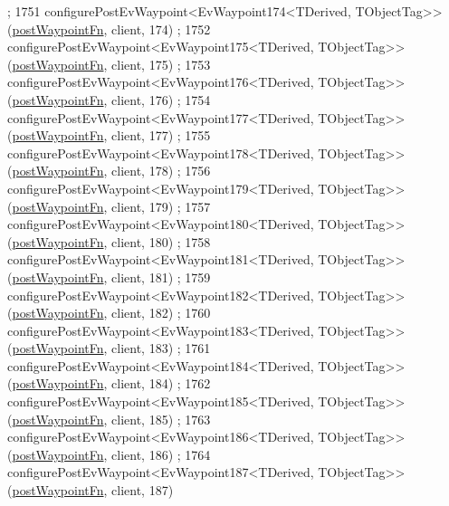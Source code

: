 \begin{DoxyCode}
      ;
1751     configurePostEvWaypoint<EvWaypoint174<TDerived, TObjectTag>>(\hyperlink{classsmacc_1_1WaypointEventDispatcher_a6bccf6a93a827634b7b5e67ac0e4ec57}{postWaypointFn}, client, 174)
      ;
1752     configurePostEvWaypoint<EvWaypoint175<TDerived, TObjectTag>>(\hyperlink{classsmacc_1_1WaypointEventDispatcher_a6bccf6a93a827634b7b5e67ac0e4ec57}{postWaypointFn}, client, 175)
      ;
1753     configurePostEvWaypoint<EvWaypoint176<TDerived, TObjectTag>>(\hyperlink{classsmacc_1_1WaypointEventDispatcher_a6bccf6a93a827634b7b5e67ac0e4ec57}{postWaypointFn}, client, 176)
      ;
1754     configurePostEvWaypoint<EvWaypoint177<TDerived, TObjectTag>>(\hyperlink{classsmacc_1_1WaypointEventDispatcher_a6bccf6a93a827634b7b5e67ac0e4ec57}{postWaypointFn}, client, 177)
      ;
1755     configurePostEvWaypoint<EvWaypoint178<TDerived, TObjectTag>>(\hyperlink{classsmacc_1_1WaypointEventDispatcher_a6bccf6a93a827634b7b5e67ac0e4ec57}{postWaypointFn}, client, 178)
      ;
1756     configurePostEvWaypoint<EvWaypoint179<TDerived, TObjectTag>>(\hyperlink{classsmacc_1_1WaypointEventDispatcher_a6bccf6a93a827634b7b5e67ac0e4ec57}{postWaypointFn}, client, 179)
      ;
1757     configurePostEvWaypoint<EvWaypoint180<TDerived, TObjectTag>>(\hyperlink{classsmacc_1_1WaypointEventDispatcher_a6bccf6a93a827634b7b5e67ac0e4ec57}{postWaypointFn}, client, 180)
      ;
1758     configurePostEvWaypoint<EvWaypoint181<TDerived, TObjectTag>>(\hyperlink{classsmacc_1_1WaypointEventDispatcher_a6bccf6a93a827634b7b5e67ac0e4ec57}{postWaypointFn}, client, 181)
      ;
1759     configurePostEvWaypoint<EvWaypoint182<TDerived, TObjectTag>>(\hyperlink{classsmacc_1_1WaypointEventDispatcher_a6bccf6a93a827634b7b5e67ac0e4ec57}{postWaypointFn}, client, 182)
      ;
1760     configurePostEvWaypoint<EvWaypoint183<TDerived, TObjectTag>>(\hyperlink{classsmacc_1_1WaypointEventDispatcher_a6bccf6a93a827634b7b5e67ac0e4ec57}{postWaypointFn}, client, 183)
      ;
1761     configurePostEvWaypoint<EvWaypoint184<TDerived, TObjectTag>>(\hyperlink{classsmacc_1_1WaypointEventDispatcher_a6bccf6a93a827634b7b5e67ac0e4ec57}{postWaypointFn}, client, 184)
      ;
1762     configurePostEvWaypoint<EvWaypoint185<TDerived, TObjectTag>>(\hyperlink{classsmacc_1_1WaypointEventDispatcher_a6bccf6a93a827634b7b5e67ac0e4ec57}{postWaypointFn}, client, 185)
      ;
1763     configurePostEvWaypoint<EvWaypoint186<TDerived, TObjectTag>>(\hyperlink{classsmacc_1_1WaypointEventDispatcher_a6bccf6a93a827634b7b5e67ac0e4ec57}{postWaypointFn}, client, 186)
      ;
1764     configurePostEvWaypoint<EvWaypoint187<TDerived, TObjectTag>>(\hyperlink{classsmacc_1_1WaypointEventDispatcher_a6bccf6a93a827634b7b5e67ac0e4ec57}{postWaypointFn}, client, 187)

\end{DoxyCode}
